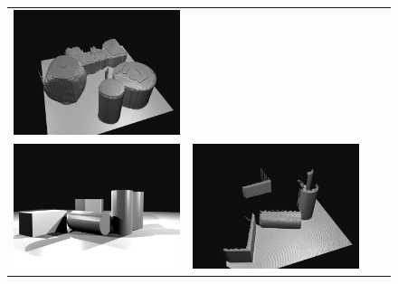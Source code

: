 \begin{figure}
\begin{tabular}{cccc}
\includegraphics[height=\turnheight]{umk4nke6pzebef2b_SEQ_pred_voxlets.png} \\
\includegraphics[height=\turnheight]{xf2hcoes8lp9fb1t_SEQ_input.png} &
\includegraphics[height=\turnheight]{xf2hcoes8lp9fb1t_SEQ_visible.png} &

\end{tabular}
\end{figure}
